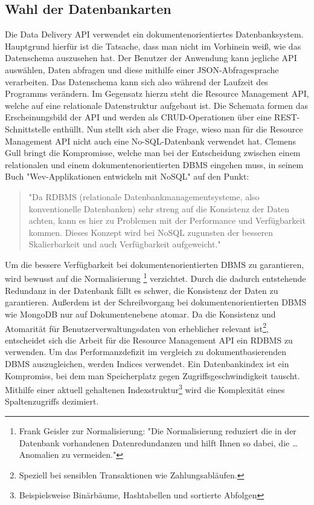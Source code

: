 \subsection{Wahl der Datenbankarten}
\label{subsec:wahlderdatenbankarten}
Die Data Delivery API verwendet ein dokumentenorientiertes Datenbanksystem.
Hauptgrund hierfür ist die Tatsache, dass man nicht im Vorhinein weiß, wie das
Datenschema auszusehen hat. Der Benutzer der Anwendung kann jegliche API
auswählen, Daten abfragen und diese mithilfe einer JSON-Abfragesprache verarbeiten. Das Datenschema
kann sich also während der Laufzeit des Programms verändern. Im Gegensatz hierzu steht die Resource
Management API, welche auf eine relationale Datenstruktur aufgebaut ist. Die Schemata formen das
Erscheinungsbild der API und werden als CRUD-Operationen über eine REST-Schnittstelle enthüllt.
Nun stellt sich aber die Frage, wieso man für die Resource Management API nicht auch eine
No-SQL-Datenbank verwendet hat. Clemens Gull bringt die Kompromisse, welche man bei der
Entscheidung zwischen einem relationalen und einem dokumentenorientierten DBMS
eingehen muss, in seinem Buch "Wev-Applikationen entwickeln mit NoSQL" auf den Punkt:

\begin{quote}
"Da RDBMS (relationale Datenbankmanagementsysteme, also konventionelle Datenbanken) sehr streng
auf die Konsistenz der Daten achten, kann es hier zu Problemen mit der Performance und Verfügbarkeit
kommen. Dieses Konzept wird bei NoSQL zugunsten der besseren Skalierbarkeit und auch Verfügbarkeit
aufgeweicht."\cite[S. 18]{NoSQLClemensGull}
\end{quote}

Um die bessere Verfügbarkeit bei dokumentenorientierten DBMS zu garantieren, wird bewusst auf die Normalisierung
\footnote{Frank Geisler zur Normalisierung: "Die Normalisierung reduziert die in der Datenbank vorhandenen Datenredundanzen und hilft Ihnen so dabei, die \dots Anomalien zu vermeiden."\cite[S. 177]{DatenbankenFrankGeisler}}
verzichtet. Durch die dadurch entstehende Redundanz in der Datenbank fällt es schwer,
die Konsistenz der Daten zu garantieren. Außerdem ist der Schreibvorgang bei dokumentenorientierten
DBMS wie MongoDB nur auf Dokumentenebene atomar.\cite{MongoDBAtomaritaet} Da die Konsistenz und Atomarität für
Benutzerverwaltungsdaten von erheblicher relevant ist\footnote{Speziell bei sensiblen Transaktionen wie Zahlungsabläufen.}, 
entscheidet sich die Arbeit für die Resource Management API ein RDBMS zu verwenden.
Um das Performanzdefizit im vergleich zu dokumentbasierenden DBMS auszugleichen,
werden Indices verwendet. Ein Datenbankindex ist ein Kompromiss, bei dem
man Speicherplatz gegen Zugriffsgeschwindigkeit tauscht.\cite{YoutubePostgresIndexing}
Mithilfe einer aktuell gehaltenen Indexstruktur\footnote{Beispielsweise Binärbäume, Hashtabellen und sortierte Abfolgen}
wird die Komplexität eines Spaltenzugriffs dezimiert.

